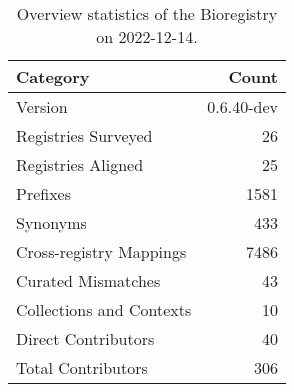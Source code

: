 \begin{table}
\centering
\caption{Overview statistics of the Bioregistry on 2022-12-14.}
\label{tab:bioregistry-summary}
\begin{tabular}{lr}
\toprule
                Category &      Count \\
\midrule
                 Version & 0.6.40-dev \\
     Registries Surveyed &         26 \\
      Registries Aligned &         25 \\
                Prefixes &       1581 \\
                Synonyms &        433 \\
 Cross-registry Mappings &       7486 \\
      Curated Mismatches &         43 \\
Collections and Contexts &         10 \\
     Direct Contributors &         40 \\
      Total Contributors &        306 \\
\bottomrule
\end{tabular}
\end{table}
